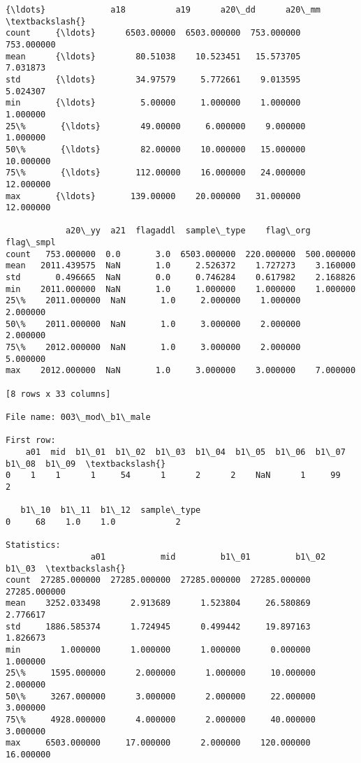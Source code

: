 \documentclass[11pt]{article}
\begin{document}
\begin{Verbatim}[commandchars=\\\{\}]
          {\ldots}             a18          a19      a20\_dd      a20\_mm  \textbackslash{}
count     {\ldots}      6503.00000  6503.000000  753.000000  753.000000   
mean      {\ldots}        80.51038    10.523451   15.573705    7.031873   
std       {\ldots}        34.97579     5.772661    9.013595    5.024307   
min       {\ldots}         5.00000     1.000000    1.000000    1.000000   
25\%       {\ldots}        49.00000     6.000000    9.000000    1.000000   
50\%       {\ldots}        82.00000    10.000000   15.000000   10.000000   
75\%       {\ldots}       112.00000    16.000000   24.000000   12.000000   
max       {\ldots}       139.00000    20.000000   31.000000   12.000000   

            a20\_yy  a21  flagaddl  sample\_type    flag\_org   flag\_smpl  
count   753.000000  0.0       3.0  6503.000000  220.000000  500.000000  
mean   2011.439575  NaN       1.0     2.526372    1.727273    3.160000  
std       0.496665  NaN       0.0     0.746284    0.617982    2.168826  
min    2011.000000  NaN       1.0     1.000000    1.000000    1.000000  
25\%    2011.000000  NaN       1.0     2.000000    1.000000    2.000000  
50\%    2011.000000  NaN       1.0     3.000000    2.000000    2.000000  
75\%    2012.000000  NaN       1.0     3.000000    2.000000    5.000000  
max    2012.000000  NaN       1.0     3.000000    3.000000    7.000000  

[8 rows x 33 columns]

File name: 003\_mod\_b1\_male

First row: 
    a01  mid  b1\_01  b1\_02  b1\_03  b1\_04  b1\_05  b1\_06  b1\_07  b1\_08  b1\_09  \textbackslash{}
0    1    1      1     54      1      2      2    NaN      1     99      2   

   b1\_10  b1\_11  b1\_12  sample\_type  
0     68    1.0    1.0            2  

Statistics: 
                 a01           mid         b1\_01         b1\_02         b1\_03  \textbackslash{}
count  27285.000000  27285.000000  27285.000000  27285.000000  27285.000000   
mean    3252.033498      2.913689      1.523804     26.580869      2.776617   
std     1886.585374      1.724945      0.499442     19.897163      1.826673   
min        1.000000      1.000000      1.000000      0.000000      1.000000   
25\%     1595.000000      2.000000      1.000000     10.000000      2.000000   
50\%     3267.000000      3.000000      2.000000     22.000000      3.000000   
75\%     4928.000000      4.000000      2.000000     40.000000      3.000000   
max     6503.000000     17.000000      2.000000    120.000000     16.000000   


\end{Verbatim}
\end{document}
